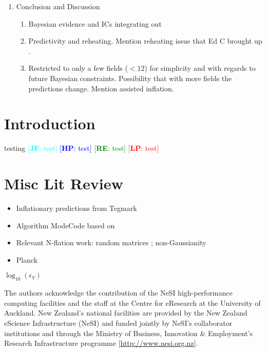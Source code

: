 \documentclass[a4paper,11pt]{article}
\newcommand{\re}[1]{\textcolor{green}{[{\bf RE}: #1]}}
\newcommand{\lp}[1]{\textcolor{red}{[{\bf LP}: #1]}}
\newcommand{\hp}[1]{\textcolor{blue}{[{\bf HP}: #1]}}
\newcommand{\jf}[1]{\textcolor{cyan}{[{\bf JF}: #1]}}
\begin{document}
\begin{enumerate}
  \item Conclusion and Discussion

    \begin{enumerate}

      \item Bayesian evidence and ICs integrating out

      \item Predictivity and reheating.  Mention reheating issue that Ed C brought up \cite{Leung:2012ve}.

      \item Restricted to only a few fields ($<12$) for simplicity and with regards to future Bayesian constraints.  Possibility that with more fields the predictions change.  Mention assisted inflation.

    \end{enumerate}

\end{enumerate}

\section{Introduction}
\label{sect:introduction}

testing \jf{test} \hp{test} \re{test} \lp{test}


\section{Misc Lit Review}
\label{sect:litreview}

\begin{itemize}

  \item Inflationary predictions from Tegmark \cite{Tegmark:2004qd}

  \item Algorithm ModeCode based on \cite{Adams:2001vc}

  \item Relevant N-flation work: random matrices \cite{Easther:2005zr}; non-Gaussianity \cite{Kim:2011jea,Barnaby:2010vf,Kim:2006te}

  \item Planck \cite{Ade:2013xsa,Ade:2013rta}

\end{itemize}

$\log_{10}(\epsilon_V)$



\acknowledgments

The authors acknowledge the contribution of the NeSI high-performance computing facilities and the staff at the Centre for eResearch at the University of Auckland. New Zealand's national facilities are provided by the New Zealand eScience Infrastructure (NeSI) and funded jointly by NeSI's collaborator institutions and through the Ministry of Business, Innovation \& Employment's Research Infrastructure programme [{\url{http://www.nesi.org.nz}}].





\end{document}
